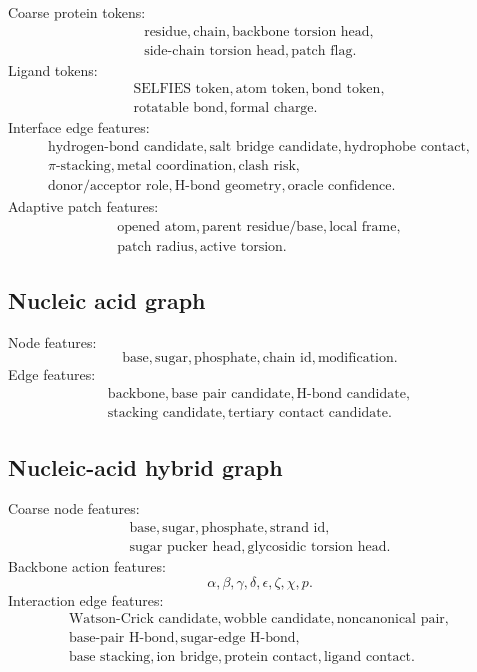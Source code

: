 \documentclass[11pt]{article}
\begin{document}
Coarse protein tokens:
\[
\begin{gathered}
\text{residue},\text{chain},\text{backbone torsion head},\\
\text{side-chain torsion head},\text{patch flag}.
\end{gathered}
\]
Ligand tokens:
\[
\begin{gathered}
\text{SELFIES token},\text{atom token},\text{bond token},\\
\text{rotatable bond},\text{formal charge}.
\end{gathered}
\]
Interface edge features:
\[
\begin{gathered}
\text{hydrogen-bond candidate},\text{salt bridge candidate},
\text{hydrophobe contact},\\
\pi\text{-stacking},\text{metal coordination},\text{clash risk},\\
\text{donor/acceptor role},\text{H-bond geometry},
\text{oracle confidence}.
\end{gathered}
\]
Adaptive patch features:
\[
\begin{gathered}
\text{opened atom},\text{parent residue/base},\text{local frame},\\
\text{patch radius},\text{active torsion}.
\end{gathered}
\]

\subsection{Nucleic acid graph}

Node features:
\[
\text{base},\text{sugar},\text{phosphate},\text{chain id},\text{modification}.
\]
Edge features:
\[
\begin{gathered}
\text{backbone},\text{base pair candidate},\text{H-bond candidate},\\
\text{stacking candidate},\text{tertiary contact candidate}.
\end{gathered}
\]

\subsection{Nucleic-acid hybrid graph}

Coarse node features:
\[
\begin{gathered}
\text{base},\text{sugar},\text{phosphate},\text{strand id},\\
\text{sugar pucker head},\text{glycosidic torsion head}.
\end{gathered}
\]
Backbone action features:
\[
\alpha,\beta,\gamma,\delta,\epsilon,\zeta,\chi,p.
\]
Interaction edge features:
\[
\begin{gathered}
\text{Watson-Crick candidate},\text{wobble candidate},
\text{noncanonical pair},\\
\text{base-pair H-bond},\text{sugar-edge H-bond},\\
\text{base stacking},\text{ion bridge},\text{protein contact},
\text{ligand contact}.
\end{gathered}
\]
\end{document}
